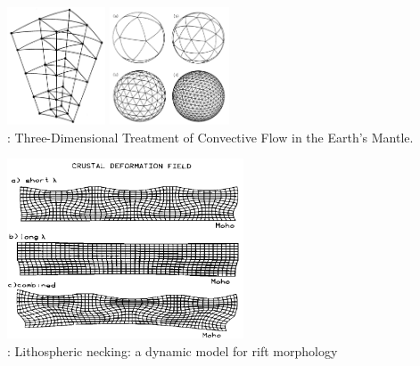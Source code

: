 \begin{center}
\begin{minipage}{0.48\textwidth}
\centering
\includegraphics[height=3.5cm]{images/history/baum85a}
\includegraphics[height=3.5cm]{images/history/baum85b}\\
{: Three-Dimensional Treatment of Convective Flow in the Earth's Mantle.
\cite{baum85}}
\end{minipage}\hfill
\begin{minipage}{0.45\textwidth}
\centering
\includegraphics[width=7cm]{images/history/zupf86}\\
{: Lithospheric necking: a dynamic model for rift morphology \cite{zupf86}}
\end{minipage}
\end{center}


